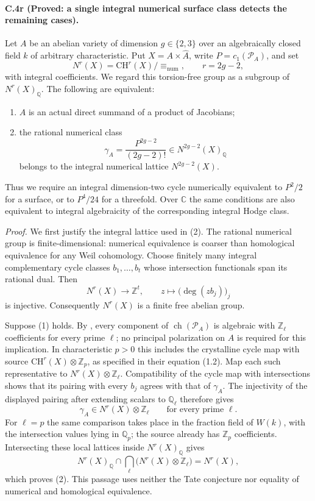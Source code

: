 \paragraph{C.4r (Proved: a single integral numerical surface class detects the remaining cases).}
Let $A$ be an abelian variety of dimension $g\in\{2,3\}$ over an
algebraically closed field $k$ of arbitrary characteristic.
Put $X=A\times\widehat A$, write $P=c_1(\mathcal P_A)$, and set
\[
 N^r(X)=\mathrm{CH}^r(X)/{\equiv_{\mathrm{num}}},
 \qquad r=2g-2,
\]
with integral coefficients. We regard this torsion-free group as
a subgroup of $N^r(X)_{\mathbb Q}$.
The following are equivalent:
\begin{enumerate}
\item $A$ is an actual direct summand of a product of Jacobians;
\item the rational numerical class
\[
                 \gamma_A=\frac{P^{2g-2}}{(2g-2)!}
                 \in N^{2g-2}(X)_{\mathbb Q}
\]
belongs to the integral numerical lattice $N^{2g-2}(X)$.
\end{enumerate}
Thus we require an integral dimension-two cycle numerically
equivalent to $P^2/2$ for a surface, or to $P^4/24$ for a
threefold. Over $\mathbb C$ the same conditions are also
equivalent to integral algebraicity of the corresponding
integral Hodge class.

\emph{Proof.}
We first justify the integral lattice used in (2).
The rational numerical group is finite-dimensional: numerical
equivalence is coarser than homological equivalence for any
Weil cohomology. Choose finitely many integral complementary
cycle classes $b_1,\ldots,b_t$ whose intersection functionals
span its rational dual. Then
\[
 N^r(X)\longrightarrow\mathbb Z^t,\qquad
 z\longmapsto\bigl(\deg(zb_j)\bigr)_j
\]
is injective. Consequently $N^r(X)$ is a finite free abelian
group.

Suppose (1) holds. By \citet[Theorem 1.2 and the paragraph
immediately following it]{cyScaviaSuzuki2025}, every component
of $\operatorname{ch}(\mathcal P_A)$ is algebraic with
$\mathbb Z_\ell$ coefficients for every prime $\ell$; no
principal polarization on $A$ is required for this implication.
In characteristic $p>0$ this includes the crystalline cycle
map with source $\mathrm{CH}^r(X)\otimes\mathbb Z_p$, as
specified in their equation (1.2).
Map each such representative to $N^r(X)\otimes\mathbb Z_\ell$.
Compatibility of the cycle map with intersections shows that
its pairing with every $b_j$ agrees with that of $\gamma_A$.
The injectivity of the displayed pairing after extending
scalars to $\mathbb Q_\ell$ therefore gives
\[
 \gamma_A\in N^r(X)\otimes\mathbb Z_\ell
 \qquad\text{for every prime }\ell.
\]
For $\ell=p$ the same comparison takes place in the fraction
field of $W(k)$, with the intersection values lying in
$\mathbb Q_p$; the source already has $\mathbb Z_p$
coefficients. Intersecting these local lattices inside
$N^r(X)_{\mathbb Q}$ gives
\[
 N^r(X)_{\mathbb Q}\cap
       \bigcap_{\ell}\bigl(N^r(X)\otimes\mathbb Z_\ell\bigr)
       =N^r(X),
\]
which proves (2). This passage uses neither the Tate conjecture
nor equality of numerical and homological equivalence.

